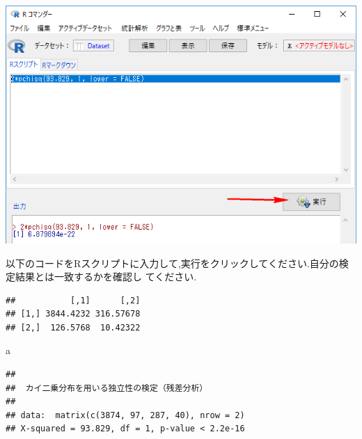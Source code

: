 \documentclass[11pt,]{problemset}
\newenvironment{Shaded}{\begin{snugshade}}{\end{snugshade}}
\newcommand{\CommentTok}[1]{\textcolor[rgb]{0.56,0.35,0.01}{\textit{#1}}}
\newcommand{\DataTypeTok}[1]{\textcolor[rgb]{0.13,0.29,0.53}{#1}}
\newcommand{\DecValTok}[1]{\textcolor[rgb]{0.00,0.00,0.81}{#1}}
\newcommand{\KeywordTok}[1]{\textcolor[rgb]{0.13,0.29,0.53}{\textbf{#1}}}
\newcommand{\NormalTok}[1]{#1}
\newcommand{\OperatorTok}[1]{\textcolor[rgb]{0.81,0.36,0.00}{\textbf{#1}}}
\newcommand{\StringTok}[1]{\textcolor[rgb]{0.31,0.60,0.02}{#1}}
\begin{document}
\begin{center}\includegraphics[width=0.7\linewidth]{pic/mychisqtest02} \end{center}

以下のコードをRスクリプトに入力して,実行をクリックしてください.自分の検定結果とは一致するかを確認し
てください.

\begin{Shaded}
\end{Shaded}

\begin{verbatim}
##           [,1]      [,2]
## [1,] 3844.4232 316.57678
## [2,]  126.5768  10.42322
\end{verbatim}

\begin{Shaded}
\begin{Highlighting}[]
\NormalTok{a}
\end{Highlighting}
\end{Shaded}

\begin{verbatim}
## 
##  カイ二乗分布を用いる独立性の検定（残差分析）
## 
## data:  matrix(c(3874, 97, 287, 40), nrow = 2)
## X-squared = 93.829, df = 1, p-value < 2.2e-16
\end{verbatim}
\end{document}
